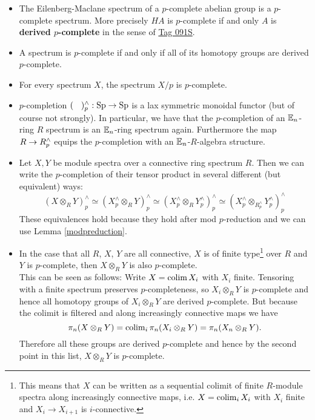 \begin{itemize}
    \item The Eilenberg-Maclane spectrum of a $p$-complete abelian group is a $p$-complete spectrum. More precisely $HA$ is $p$-complete if and only $A$ is \textbf{derived $p$-complete} in the sense of \href{https://stacks.math.columbia.edu/tag/091S}{Tag 091S}.
    \item A spectrum is $p$-complete if and only if all of its homotopy groups are derived $p$-complete.
    \item For every spectrum $X$, the spectrum $X/p$ is $p$-complete.
    \item $p$-completion $(\phantom{X})^{\wedge}_p:\operatorname{Sp}\to\operatorname{Sp}$ is a lax symmetric monoidal functor (but of course not strongly).
    In particular, we have that the $p$-completion of an $\mathbb{E}_n$-ring $R$ spectrum is an $\mathbb{E}_n$-ring spectrum again. Furthermore the map $R\rightarrow R_p^{\wedge}$ equips the $p$-completion with an $\mathbb{E}_n$-$R$-algebra structure.
    \item Let $X,Y$ be module spectra over a connective ring spectrum $R$. Then we can write the $p$-completion of their tensor product in several different (but equivalent) ways:
    \begin{equation*}
        \left( X\otimes_R Y \right)_p^{\wedge}\simeq\left( X_p^{\wedge}\otimes_R Y \right)_p^{\wedge} \simeq\left( X_p^{\wedge}\otimes_R Y_p^{\wedge} \right)_p^{\wedge} \simeq\left( X_p^{\wedge}\otimes_{R_p^{\wedge}} Y_p^{\wedge} \right)_p^{\wedge} 
    \end{equation*}
    These equivalences hold because they hold after mod $p$-reduction and we can use Lemma \ref{modpreduction}.
    \item In the case that all $R$, $X$, $Y$ are all connective, $X$ is of finite type\footnote{This means that $X$ can be written as a sequential colimit of finite $R$-module spectra along increasingly connective maps, i.e. $X=\operatorname{colim}_i X_i$ with $X_i$ finite and $X_i\to X_{i+1}$ is $i$-connective.} over $R$ and $Y$ is $p$-complete, then $X\otimes_R Y$ is also $p$-complete. \\
    This can be seen as follows: Write $X=\operatorname{colim} X_i$ with $X_i$ finite. Tensoring with a finite spectrum preserves $p$-completeness, so $X_i\otimes_R Y$ is $p$-complete and hence all homotopy groups of $X_i\otimes_R Y$ are derived $p$-complete. But because the colimit is filtered and along increasingly connective maps we have
    \begin{equation*}
        \pi_n(X\otimes_R Y)=\operatorname{colim}_i \pi_n(X_i\otimes_R Y)=\pi_n(X_n\otimes_R Y).
    \end{equation*}
    Therefore all these groups are derived $p$-complete and hence by the second point in this list, $X\otimes_R Y$ is $p$-complete.
\end{itemize}
